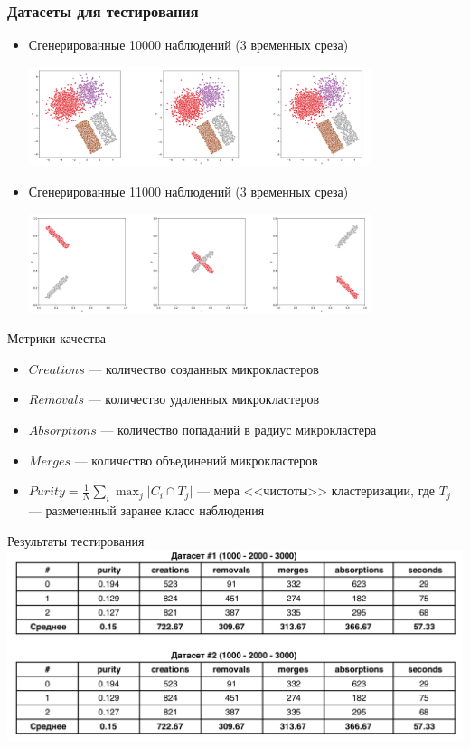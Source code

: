 \documentclass{beamer}
\begin{document}
\begin{frame}
    \frametitle{Датасеты для тестирования}
    
    \begin{itemize}
        \item Сгенерированные 10000 наблюдений (3 временных среза)
        
        \includegraphics[width=10cm]{2020-01-29_03-29-26.png}
        
        \item Сгенерированные 11000 наблюдений (3 временных среза)
        
        \includegraphics[width=10cm]{2020-01-29_03-29-44.png}
        
    \end{itemize}

\end{frame}

\begin{frame}{Метрики качества}

    \begin{itemize}
        \item $Creations$ --- количество созданных микрокластеров
        \item $Removals$ --- количество удаленных микрокластеров
        \item $Absorptions$ --- количество попаданий в радиус микрокластера
        \item $Merges$ --- количество объединений микрокластеров
        \item $Purity = \frac{1}{N} \sum_i \max_j \vert C_i \cap T_j \vert$ --- мера <<чистоты>> кластеризации, где $T_j$ --- размеченный заранее класс наблюдения
    \end{itemize}
    
\end{frame}

\begin{frame}{Результаты тестирования}
\centering
    \includegraphics[width=\textwidth]{2019-12-20_16-54-26.png}
\end{frame}
\end{document}
